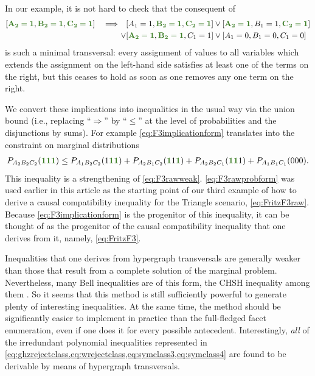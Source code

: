 \documentclass[aps,english,10pt,superscriptaddress,onecolumn,twoside,longbibliography,pra,floatfix,fleqn,nofootinbib]{revtex4-1}%
\newcommand*{\mgreen}[1]{{\color{OliveGreen}{\mathbf{#1}}}}
\theoremstyle{definition}
\newcounter{example}[section]
\newcommand{\eql}{=}
\DeclarePairedDelimiter{\parens}{\lparen}{\rparen}
\DeclarePairedDelimiter{\bracks}{\lbrack}{\rbrack}
\begin{document}
In our example, it is not hard to check that the consequent of
\begin{align}\begin{split}\label{eq:F3implicationform}
	\bracks{\mgreen{A_2 \eql 1}, \mgreen{B_2 \eql 1}, \mgreen{C_2 \eql 1}}  \quad\Longrightarrow\quad & \bracks{A_1 \eql 1, \mgreen{B_2 \eql 1}, \mgreen{C_2 \eql 1}} \lor \bracks{\mgreen{A_2 \eql 1}, B_1 \eql 1, \mgreen{C_2 \eql 1}} \\
	 \lor & \bracks{\mgreen{A_2 \eql 1}, \mgreen{B_2 \eql 1}, C_1 \eql 1} \lor \bracks{A_1 \eql 0, B_1 \eql 0, C_1 \eql 0}
\end{split}\end{align}
is such a minimal transversal: every assignment of values to all variables which extends the assignment on the left-hand side satisfies at least one of the terms on the right, but this ceases to hold as soon as one removes any one term on the right. 

We convert these implications into inequalities in the usual way via the union bound (i.e., replacing ``$\Rightarrow$'' by ``$\leq$'' at the level of probabilities and the disjunctions by sums). For example \cref{eq:F3implicationform} translates into the constraint on marginal distributions
\begin{align}\label{eq:F3rawprobform}
    P_{A_2 B_2 C_2}\parens{\mgreen{1} \mgreen{1} \mgreen{1}} \leq P_{A_1 B_2 C_2}\parens{1 \mgreen{1 1}}+P_{A_2 B_1 C_2}\parens{\mgreen{1} 1 \mgreen{1}}+P_{A_2 B_2 C_1}\parens{\mgreen{1 1} 1} + P_{A_1 B_1 C_1}\parens{0 0 0}.
\end{align}
This inequality is a strengthening of \cref{eq:F3rawweak}.  \cref{eq:F3rawprobform} was used earlier in this article as the starting point of our third example of how to derive a causal compatibility inequality for the Triangle scenario, \cref{eq:FritzF3raw}. Because \cref{eq:F3implicationform} is the progenitor of this inequality, it can be thought of as the progenitor of the causal compatibility inequality that one derives from it, namely, \cref{eq:FritzF3}.  

Inequalities that one derives from hypergraph transversals are generally weaker than those that result from a complete solution of the marginal problem. Nevertheless, many Bell inequalities are of this form, the CHSH inequality among them \cite{Ghirardi08}.  So it seems that this method is still sufficiently powerful to generate plenty of interesting inequalities. At the same time, the method should be significantly easier to implement in practice than the full-fledged facet enumeration, even if one does it for every possible antecedent. Interestingly, \emph{all} of the irredundant polynomial inequalities represented in \cref{eq:ghzrejectclass,eq:wrejectclass,eq:symclass3,eq:symclass4} are found to be derivable by means of hypergraph transversals.
\end{document}
